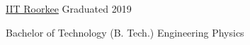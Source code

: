
\timedsubsection
  {\href{https://www.iitr.ac.in/}{IIT Roorkee}}
  {Graduated 2019}

\begin{sectiondescription}
  Bachelor of Technology (B. Tech.) \hfill Engineering Physics~\iconAtom\\%
\end{sectiondescription}